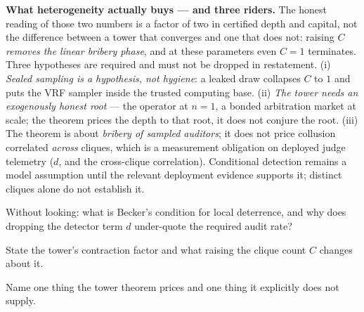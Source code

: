 \documentclass[11pt,a4paper]{article}
\theoremstyle{definition}
\begin{document}


\noindent\textbf{What heterogeneity actually buys --- and three riders.} The honest
reading of those two numbers is a factor of two in certified depth and capital, not
the difference between a tower that converges and one that does not: raising $C$
\emph{removes the linear bribery phase}, and at these parameters even $C=1$
terminates. Three hypotheses are required and must not be dropped in
restatement. (i) \emph{Sealed sampling is a hypothesis, not hygiene}: a leaked draw
collapses $C$ to $1$ and puts the VRF sampler inside the trusted computing base.
(ii) \emph{The tower needs an exogenously honest root} --- the operator at $n=1$, a
bonded arbitration market at scale; the theorem prices the depth to that root, it
does not conjure the root. (iii) The theorem is about \emph{bribery of sampled
auditors}; it does not price collusion correlated \emph{across} cliques, which is a
measurement obligation on deployed judge telemetry ($d$, and the cross-clique
correlation). Conditional detection remains a model assumption until the relevant
deployment evidence supports it; distinct cliques alone do not establish it.


\pdexercisepointer*{\ref{ex:stp-grading-oracle-hole}}{\ref{ex:stp-tower-amortization}}{\pageref{ex:stp-grading-oracle-hole}}

\begin{pdrecitation}
\item Without looking: what is Becker's condition for local deterrence, and
why does dropping the detector term $d$ under-quote the required audit rate?
\item State the tower's contraction factor and what raising the clique count
$C$ changes about it.
\item Name one thing the tower theorem prices and one thing it explicitly
does not supply.
\end{pdrecitation}
\end{document}
